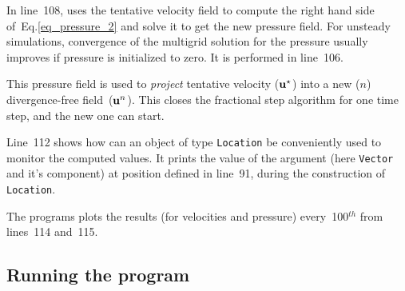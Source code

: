 In line~108, {\psiboil} uses the tentative velocity field to compute the right hand
side of~Eq.\ref{eq_pressure_2} and solve it to get the new pressure field. For unsteady
simulations, convergence of the multigrid solution for the pressure usually improves
if pressure is initialized to zero. It is performed in line~106. 

This pressure field is used to {\em project} tentative velocity (${\bf u}^\star$)
into a new ($n$) divergence-free field~(${\bf u}^n$). This closes the fractional
step algorithm for one time step, and the new one can start. 

Line~112 shows how can an object of type {\tt Location} be conveniently used to
monitor the computed values. It prints the value of the argument (here {\tt Vector}
and it's component) at position defined in line~91, during the construction of
{\tt Location}. 

The programs plots the results (for velocities and pressure) every~100$^{th}$ from
lines~114 and~115.

\subsection{Running the program}  

